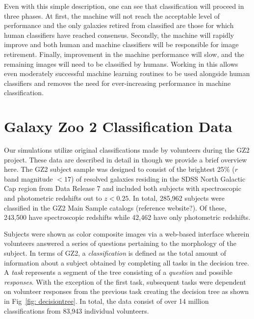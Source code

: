 \documentclass[twocolumn]{aastex6}
\begin{document}
Even with this simple description, one can see that classification will proceed in three phases. At first, the machine will not reach the acceptable level of performance and the only galaxies retired from classified are those for which human classifiers have reached consensus. Secondly, the machine will rapidly improve and both human and machine classifiers will be responsible for image retirement. Finally, improvement in the machine performance will slow, and the remaining images will need to be classified by humans. Working in this allows even moderately successful machine learning routines to be used alongside human classifiers and removes the need for ever-increasing performance in machine classification.


\section{Galaxy Zoo 2 Classification Data} \label{sec:data}

Our simulations utilize original classifications made by volunteers during the GZ2 project. 
These data are described in detail in \citep{Willett2013} though we provide a brief overview here.  
The GZ2 subject sample was designed to consist of the brightest 25\% ($r$ band magnitude $< 17$) 
of resolved galaxies residing in the SDSS North Galactic Cap region from Data Release 7 
and included both subjects with spectroscopic and photometric redshifts out to $z < 0.25$.
In total, 285,962 subjects were classified in the GZ2 Main Sample catalogs (reference website?). 
Of these, 243,500 have spectroscopic redshifts while 42,462 have only photometric redshifts.  

Subjects were shown as color composite images via a web-based interface wherein 
volunteers answered a series of questions pertaining to the morphology of the subject.
In terms of GZ2, a \textit{classification} is defined as the total amount of information about a subject 
obtained by completing all tasks in the decision tree. A \textit{task} represents a segment of the
tree consisting of a \textit{question} and possible \textit{responses}. 
With the exception of the first task, subsequent tasks were
dependent on volunteer responses from the previous task creating the decision tree 
as shown in Fig~\ref{fig: decisiontree}.
 In total, the data consist of over 14 million classifications from 83,943 individual volunteers. 
\end{document}
